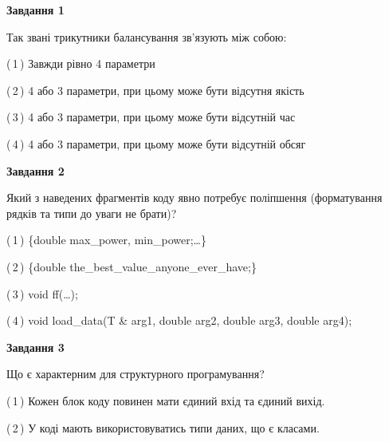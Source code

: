 \documentclass[10pt, ukrainian]{article}
\begin{document}
{
\begin {large}
{\begin {center}\textbf{Завдання 1}\end {center}}\par
Так звані трикутники балансування зв'язують між собою:\par
\vspace{2mm}



(\,1\,) Завжди рівно 4 параметри%



(\,2\,) 4 або 3 параметри, при цьому може бути відсутня якість%



(\,3\,) 4 або 3 параметри, при цьому може бути відсутній час%



(\,4\,) 4 або 3 параметри, при цьому може бути відсутній обсяг %


{\begin {center}\textbf{Завдання 2}\end {center}}\par
Який з наведених фрагментів коду явно потребує поліпшення (форматування рядків та типи до уваги не брати)?\par
\vspace{2mm}



(\,1\,) \{double max\_power, min\_power;…\} %



(\,2\,) \{double the\_best\_value\_anyone\_ever\_have;\} %



(\,3\,) void ff(…);%



(\,4\,) void load\_data(T \& arg1, double arg2, double arg3, double arg4); %


{\begin {center}\textbf{Завдання 3}\end {center}}\par
Що є характерним для структурного програмування?\par
\vspace{2mm}



(\,1\,) Кожен блок коду повинен мати єдиний вхід та єдиний вихід.%



(\,2\,) У коді мають використовуватись типи даних, що є класами. %




\end{large}}
\end{document}

